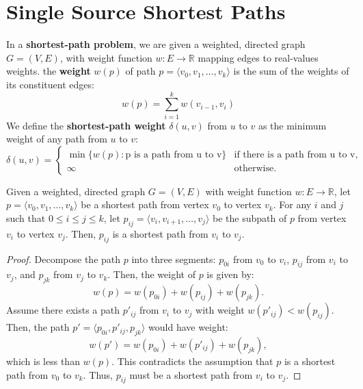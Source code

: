 \newpage
\section{Single Source Shortest Paths}

In a \textbf{shortest-path problem}, we are given a weighted, directed graph $G = (V, E)$, with weight function $w : E \to \mathbb{R}$ mapping edges to 
real-values weights. the \textbf{weight} $w(p)$ of path $p = \langle v_0,v_1,\dots,v_k \rangle$ is the sum of the weights of its constituent edges:
\[
    w(p) = \sum_{i=1}^{k} w(v_{i-1}, v_i)
\]
We define the \textbf{shortest-path weight} $\delta(u,v)$ from $u$ to $v$ as the minimum weight of any path from $u$ to $v$:
\[
    \delta(u,v) = 
    \begin{cases}
        \min \{ w(p) : \text{p is a path from u to v} \} & \text{if there is a path from u to v}, \\
        \infty & \text{otherwise}.
    \end{cases}
\]

\newtheorem{subpaths}{Lemma}
\begin{theorem}
    Given a weighted, directed graph $G = (V, E)$ with weight function $w : E \to \mathbb{R}$, let $p = \langle v_0, v_1, \dots, v_k \rangle$ be a shortest path from vertex $v_0$ to vertex $v_k$. For any $i$ and $j$ such that $0 \leq i \leq j \leq k$, let $p_{ij} = \langle v_i, v_{i+1}, \dots, v_j \rangle$ be the subpath of $p$ from vertex $v_i$ to vertex $v_j$. Then, $p_{ij}$ is a shortest path from $v_i$ to $v_j$.
\end{theorem}
\begin{proof}
    Decompose the path $p$ into three segments: $p_{0i}$ from $v_0$ to $v_i$, $p_{ij}$ from $v_i$ to $v_j$, and $p_{jk}$ from $v_j$ to $v_k$. Then, the weight of $p$ is given by:
    \[
    w(p) = w(p_{0i}) + w(p_{ij}) + w(p_{jk}).
    \]
    Assume there exists a path $p'_{ij}$ from $v_i$ to $v_j$ with weight $w(p'_{ij}) < w(p_{ij})$. Then, the path $p' = \langle p_{0i}, p'_{ij}, p_{jk} \rangle$ would have weight:
    \[
    w(p') = w(p_{0i}) + w(p'_{ij}) + w(p_{jk}),
    \]
    which is less than $w(p)$. This contradicts the assumption that $p$ is a shortest path from $v_0$ to $v_k$. Thus, $p_{ij}$ must be a shortest path from $v_i$ to $v_j$. 
\end{proof}

